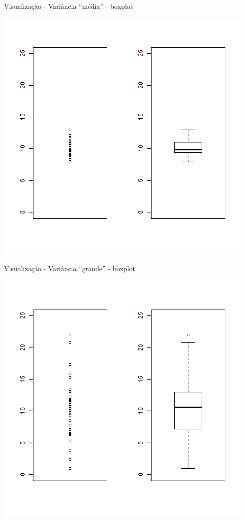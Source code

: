 \documentclass{beamer}
\begin{document}
\begin{frame}{Visualização - Variância ``média'' - boxplot}
  \begin{center}
    \includegraphics[height=.8\textheight]{Cap17/dot-box-M}
  \end{center}
\end{frame}

\begin{frame}{Visualização - Variância ``grande'' - boxplot}
  \begin{center}
    \includegraphics[height=.8\textheight]{Cap17/dot-box-G}
  \end{center}
\end{frame}
\end{document}
